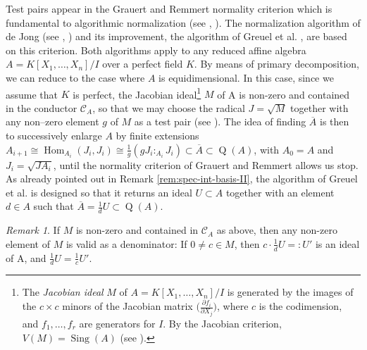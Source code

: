 \documentclass[a4paper,11pt]{amsart}%
\theoremstyle{definition}
\theoremstyle{plain}
\theoremstyle{remark}
\newtheorem{remark}[defn]{Remark}
\DeclareMathOperator{\Sing}{Sing}
\DeclareMathOperator{\Hom}{Hom}
\DeclareMathOperator{\TQR}{Q}
\begin{document}
Test pairs appear in the Grauert and Remmert normality criterion which is
fundamental to algorithmic normalization (see \cite{GR}, \cite[Prop.~3.6.5]{GP}).
The normalization algorithm of de Jong  (see \cite{deJong98}, \cite{DGPJ}) and its 
improvement, the algorithm of Greuel et al. \cite{GLS10}, are based on this criterion. 
Both algorithms apply to any reduced affine algebra $A=K[X_1,\dots,X_n]/I$ over a 
perfect field $K$. By means of primary decomposition, we can reduce to the case 
where $A$ is equidimensional. In this case, since we assume that $K$ is perfect, the 
Jacobian ideal\footnote{The {\emph{Jacobian ideal}} $M$ of $A=K[X_1,\dots,X_n]/I$ is generated by the 
images of the $c\times c$ minors of the Jacobian matrix $\big(\frac{\partial f_{i}}{\partial X_{j}}\big)$, 
where $c$ is the codimension, and $f_{1},\dots,f_{r}$ are generators 
for $I$. By the Jacobian criterion, $V(M) = \Sing(A)$ (see 
\cite[Theorem 16.19]{Eis}).} $M$ of A is non-zero and contained in the conductor $\mathcal{C}_{A}$, 
so that we may choose the radical $J=\sqrt{M}$ together with any
non--zero element $g$ of $M$ as a test pair (see \cite[Lemma 4.1]{GLS10}). The idea of
finding $\overline{A}$ is then to successively enlarge $A$ by finite extensions $A_{i+1}\cong\Hom_{A_{i}}%
(J_{i},J_{i})\cong\frac{1}{g}(gJ_{i}:_{A_{i}}J_{i})\subset\overline{A}%
\subset\TQR(A)$, with $A_{0}=A$ and $J_{i}=\sqrt{JA_{i}}$, until the normality
criterion of Grauert and Remmert  allows us stop. As already pointed out in Remark \ref{rem:spec-int-basis-II}, 
the algorithm of Greuel et al. is designed so that it returns an ideal $U\subset A$ together 
with an element $d\in A$ such that $\overline{A}=\frac{1} {d}U\subset\TQR(A)$.

\begin{remark}
\label{rem:choice-of denominator}
If $M$ is non-zero and contained in $\mathcal{C}_{A}$ as above, then any non-zero element of $M$ is 
valid as a denominator: If $0\neq c \in M$, then $c \cdot \frac{1} {d}U
=: U'$ is an ideal of A, and $\frac{1} {d}U  = \frac{1} {c}U'$.
\end{remark}
\end{document}
